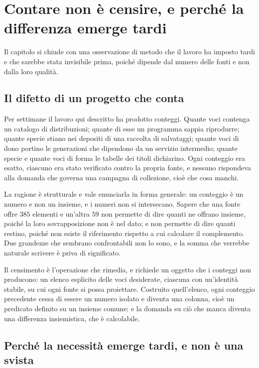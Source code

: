 \section{Contare non è censire, e perché la differenza emerge tardi}

Il capitolo si chiude con una osservazione di metodo che il lavoro ha imposto tardi e che sarebbe stata invisibile prima, poiché dipende dal numero delle fonti e non dalla loro qualità.

\subsection*{Il difetto di un progetto che conta}

Per settimane il lavoro qui descritto ha prodotto conteggi. Quante voci contenga un catalogo di distribuzioni; quante di esse un programma sappia riprodurre; quante specie stiano nei depositi di una raccolta di salvataggi; quante voci di dono portino le generazioni che dipendono da un servizio intermedio; quante specie e quante voci di forma le tabelle dei titoli dichiarino. Ogni conteggio era esatto, ciascuno era stato verificato contro la propria fonte, e nessuno rispondeva alla domanda che governa una campagna di collezione, cioè che cosa manchi.

La ragione è strutturale e vale enunciarla in forma generale: un conteggio è un numero e non un insieme, e i numeri non si intersecano. Sapere che una fonte offre $385$ elementi e un'altra $59$ non permette di dire quanti ne offrano insieme, poiché la loro sovrapposizione non è nel dato; e non permette di dire quanti restino, poiché non esiste il riferimento rispetto a cui calcolare il complemento. Due grandezze che sembrano confrontabili non lo sono, e la somma che verrebbe naturale scrivere è priva di significato.

Il censimento è l'operazione che rimedia, e richiede un oggetto che i conteggi non producono: un elenco esplicito delle voci desiderate, ciascuna con un'identità stabile, su cui ogni fonte si possa proiettare. Costruito quell'elenco, ogni conteggio precedente cessa di essere un numero isolato e diventa una colonna, cioè un predicato definito su un insieme comune; e la domanda su ciò che manca diventa una differenza insiemistica, che è calcolabile.

\subsection*{Perché la necessità emerge tardi, e non è una svista}

